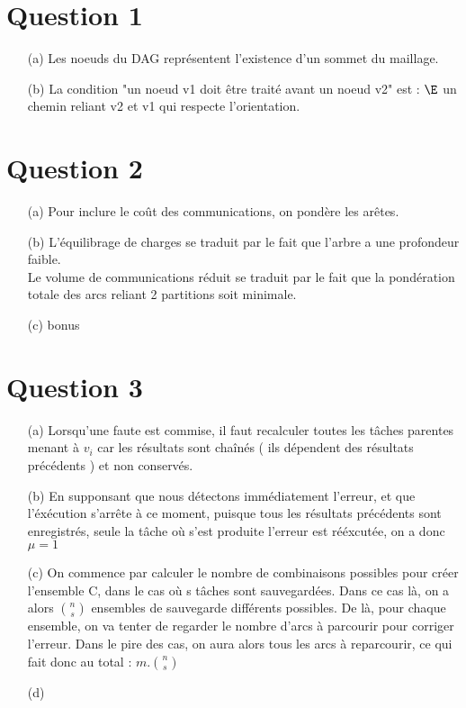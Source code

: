 \documentclass{report}
\begin{document}
\tableofcontents %

\vfill

\section{Question 1}

\begin{itemize}
	\item[(a)] Les noeuds du DAG représentent l'existence d'un sommet du maillage. 
	\item[(b)] La condition "un noeud v1 doit être traité avant un noeud v2" est : $\E$ un chemin reliant v2 et v1 qui respecte l'orientation.
\end{itemize}


\section{Question 2}

\begin{itemize}
	\item[(a)] Pour inclure le coût des communications, on pondère les arêtes.
	\item[(b)] L'équilibrage de charges se traduit par le fait que l'arbre a une profondeur faible. \\
	Le volume de communications réduit se traduit par le fait que la pondération totale des arcs reliant 2 partitions soit minimale. 
	\item[(c) bonus] 
\end{itemize}

\section{Question 3}

\begin{itemize}
	\item[(a)] Lorsqu'une faute est commise, il faut recalculer toutes les tâches parentes menant à $v_i$ car les résultats sont chaînés ( ils dépendent des résultats précédents ) et non conservés.
	\item[(b)] En supponsant que nous détectons immédiatement l'erreur, et que l'éxécution s'arrête à ce moment, puisque tous les résultats précédents sont enregistrés, seule la tâche où s'est produite l'erreur est rééxcutée, on a donc $\mu = 1$
	\item[(c)] On commence par calculer le nombre de combinaisons possibles pour créer l'ensemble C, dans le cas où s tâches sont sauvegardées. Dans ce cas là, on a alors $\binom{n}{s}$ ensembles de sauvegarde différents possibles. De là, pour chaque ensemble, on va tenter de regarder le nombre d'arcs à parcourir pour corriger l'erreur. Dans le pire des cas, on aura alors tous les arcs à reparcourir, ce qui fait donc au total  : $m.\binom{n}{s}$
	\item[(d)]
\end{itemize}
\end{document}
